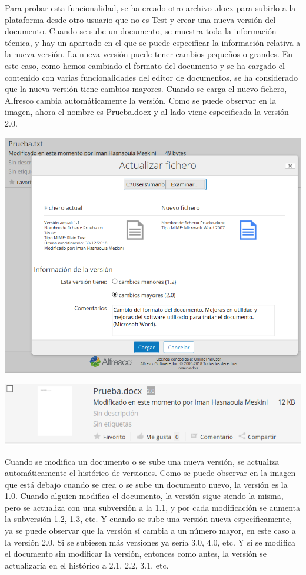 \documentclass{article}
\begin{document}
Para probar esta funcionalidad, se ha creado otro archivo .docx para subirlo a la plataforma desde otro usuario que no es Test y crear una nueva versión del documento. Cuando se sube un documento, se muestra toda la información técnica, y hay un apartado en el que se puede especificar la información relativa a la nueva versión. La nueva versión puede tener cambios pequeños o grandes. En este caso, como hemos cambiado el formato del documento y se ha cargado el contenido con varias funcionalidades del editor de documentos, se ha considerado que la nueva versión tiene cambios mayores. Cuando se carga el nuevo fichero, Alfresco cambia automáticamente la versión. Como se puede observar en la imagen, ahora el nombre es Prueba.docx y al lado viene especificada la versión 2.0.

\begin{center}
\includegraphics[scale=0.5]{images/actualizacion.png}
\end{center}

\begin{center}
\includegraphics[scale=0.3]{images/version.png}
\end{center}

Cuando se modifica un documento o se sube una nueva versión, se actualiza automáticamente el histórico de versiones. Como se puede observar en la imagen que está debajo cuando se crea o se sube un documento nuevo, la versión es la 1.0. Cuando alguien modifica el documento, la versión sigue siendo la misma, pero se actualiza con una subversión a la 1.1, y por cada modificación se aumenta la subversión 1.2, 1.3, etc. Y cuando se sube una versión nueva específicamente, ya se puede observar que la versión sí cambia a un número mayor, en este caso a la versión 2.0. Si se subiesen más versiones ya sería 3.0, 4.0, etc. Y si se modifica el documento sin modificar la versión, entonces como antes, la versión se actualizaría en el histórico a 2.1, 2.2, 3.1, etc.
\end{document}
